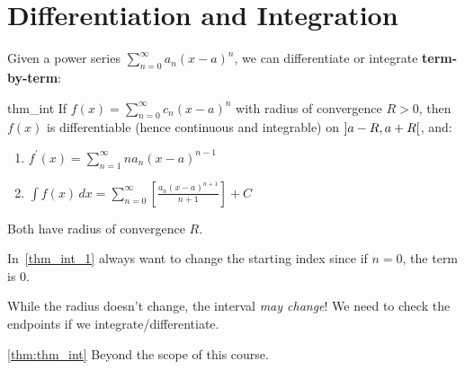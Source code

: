 \section{Differentiation and Integration}
Given a power series $ \sum\limits_{n=0}^{\infty} a_n(x-a)^n $,
we can differentiate or integrate \textbf{term-by-term}:
\begin{Theorem}{}{thm_int}
    If $ f(x)=\sum\limits_{n=0}^{\infty} c_n(x-a)^n $ with radius of convergence
    $ R>0 $, then $ f(x) $ is differentiable (hence continuous and integrable)
    on $ \interval[open]{a-R}{a+R} $, and:
    \begin{enumerate}[label=(\arabic*)]
        \item\label{thm_int_1} $ \displaystyle f^\prime(x)=\sum\limits_{n=1}^{\infty} n a_n(x-a)^{n-1} $
        \item\label{thm_int_2} $ \displaystyle\int f(x)\, d{x} =\sum\limits_{n=0}^{\infty} \left[
                      \frac{a_n(x-a)^{n+1}}{n+1}
                      \right]+C $
    \end{enumerate}
    Both have radius of convergence $ R $.
\end{Theorem}

\begin{Remark}{}{}
    In~\ref{thm_int_1} always want to change the starting index since if $ n=0 $, the term is $ 0 $.
\end{Remark}

\begin{Remark}{}{}
    While the radius doesn't change, the interval \emph{may change}! We need to check the endpoints
    if we integrate/differentiate.
\end{Remark}

\begin{Proof}{\ref{thm:thm_int}}{}
    Beyond the scope of this course.
\end{Proof}

